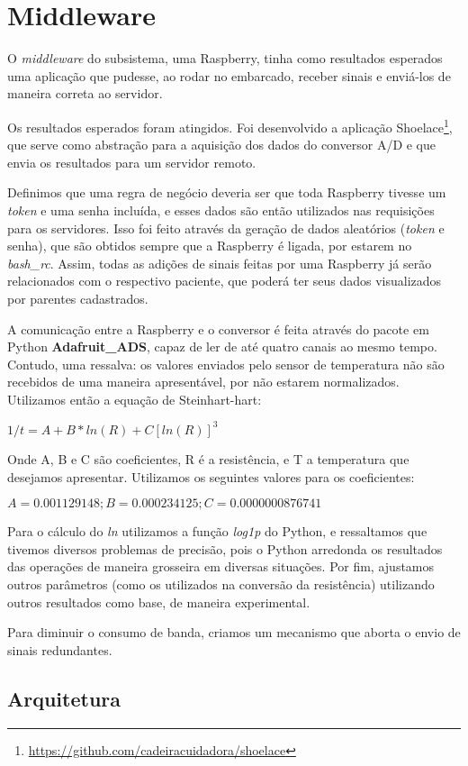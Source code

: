 \section{Middleware}

O \textit{middleware} do subsistema, uma Raspberry, tinha como resultados
esperados uma aplicação que pudesse, ao rodar no embarcado, receber sinais e
enviá-los de maneira correta ao servidor.

Os resultados esperados foram atingidos. Foi desenvolvido a aplicação
Shoelace\footnote{\url{https://github.com/cadeiracuidadora/shoelace}}, que
serve como abstração para a aquisição dos dados do conversor A/D e que envia
os resultados para um servidor remoto.

Definimos que uma regra de negócio deveria ser que toda Raspberry tivesse
um \textit{token} e uma senha incluída, e esses dados são então utilizados nas
requisições para os servidores. Isso foi feito através da geração de dados
aleatórios (\textit{token} e senha), que são obtidos sempre que a Raspberry
é ligada, por estarem no \textit{bash\_rc}. Assim, todas as adições de sinais
feitas por uma Raspberry já serão relacionados com o respectivo paciente,
que poderá ter seus dados visualizados por parentes cadastrados.

A comunicação entre a Raspberry e o conversor é feita através do pacote em
Python \textbf{Adafruit\_ADS}, capaz de ler de até quatro canais ao mesmo tempo.
Contudo, uma ressalva: os valores enviados pelo sensor de temperatura não são
recebidos de uma maneira apresentável, por não estarem normalizados. Utilizamos
então a equação de Steinhart-hart:

$ 1/t = A + B * ln(R) + C[ln(R)]^3 $

Onde A, B e C são coeficientes, R é a resistência, e T a temperatura que
desejamos apresentar. Utilizamos os seguintes valores para os coeficientes:

$ A = 0.001129148; B = 0.000234125 ; C =  0.0000000876741 $

Para o cálculo do \textit{ln} utilizamos a função \textit{log1p} do Python, e
ressaltamos que tivemos diversos problemas de precisão, pois o Python arredonda
os resultados das operações de maneira grosseira em diversas situações. Por
fim, ajustamos outros parâmetros (como os utilizados na conversão da
resistência) utilizando outros resultados como base, de maneira experimental.

Para diminuir o consumo de banda, criamos um mecanismo que aborta o envio de
sinais redundantes.

\subsection{Arquitetura}

